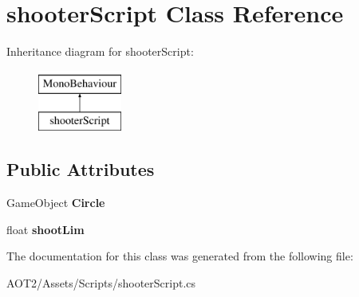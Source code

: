 \hypertarget{classshooter_script}{}\section{shooter\+Script Class Reference}
\label{classshooter_script}
Inheritance diagram for shooter\+Script\+:\begin{figure}[H]
\begin{center}
\leavevmode
\includegraphics[height=2.000000cm]{classshooter_script}
\end{center}
\end{figure}
\subsection*{Public Attributes}
\begin{DoxyCompactItemize}
\item 
\hypertarget{classshooter_script_aec5b91ec83c6e5326f9f251f46411367}{}Game\+Object {\bfseries Circle}\label{classshooter_script_aec5b91ec83c6e5326f9f251f46411367}

\item 
\hypertarget{classshooter_script_a35395b1d291048e31353f9300c4e61be}{}float {\bfseries shoot\+Lim}\label{classshooter_script_a35395b1d291048e31353f9300c4e61be}

\end{DoxyCompactItemize}


The documentation for this class was generated from the following file\+:\begin{DoxyCompactItemize}
\item 
A\+O\+T2/\+Assets/\+Scripts/shooter\+Script.\+cs\end{DoxyCompactItemize}
